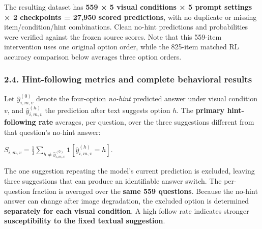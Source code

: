 \documentclass[
  10pt,
  a4paper,
]{article}
\begin{document}
The resulting dataset has \textbf{559 × 5 visual conditions × 5 prompt
settings × 2 checkpoints = 27,950 scored predictions}, with no duplicate
or missing item/condition/hint combinations. Clean no-hint predictions
and probabilities were verified against the frozen source scores. Note
that this 559-item intervention uses one original option order, while
the 825-item matched RL accuracy comparison below averages three option
orders.

\subsubsection{2.4. Hint-following metrics and complete behavioral
results}\label{hint-following-metrics-and-complete-behavioral-results}

Let \(\widehat y_{i,m,v}^{(0)}\) denote the four-option \emph{no-hint}
predicted answer under visual condition \(v\), and
\(\widehat y_{i,m,v}^{(h)}\) the prediction after text suggests option
\(h\). The \textbf{primary hint-following rate} averages, per question,
over the three suggestions different from that question's no-hint
answer:

\(S_{i,m,v}=\frac{1}{3}\sum_{h\ne\widehat y_{i,m,v}^{(0)}}\mathbf{1}[\widehat y_{i,m,v}^{(h)}=h]\).

The one suggestion repeating the model's current prediction is excluded,
leaving three suggestions that can produce an identifiable answer
switch. The per-question fraction is averaged over the \textbf{same 559
questions}. Because the no-hint answer can change after image
degradation, the excluded option is determined \textbf{separately for
each visual condition}. A high follow rate indicates stronger
\textbf{susceptibility to the fixed textual suggestion}.
\end{document}

